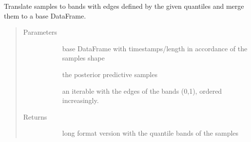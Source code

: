 \documentclass[letterpaper,10pt,english]{sphinxmanual}
\begin{document}
\begin{fulllineitems}
\label{\detokenize{autoapi/src/model/format/index:src.model.format.make_quantile_bands}}
Translate samples to bands with edges defined by the given quantiles and merge them to a base DataFrame.
\begin{quote}\begin{description}
\item[{Parameters}] \leavevmode\begin{description}
\item[{}] \leavevmode{[}\sphinxcode{\sphinxupquote{pd.DataFrame}}{]}
base DataFrame with timestamps/length in accordance of the samples shape

\item[{}] \leavevmode{[}\sphinxcode{\sphinxupquote{np.array}}{]}
the posterior predictive samples

\item[{}] \leavevmode
an iterable with the edges of the bands (0,1), ordered increasingly.

\end{description}

\item[{Returns}] \leavevmode\begin{description}
\item[{}] \leavevmode
long format version with the quantile bands of the samples

\end{description}

\end{description}\end{quote}

\end{fulllineitems}

\end{document}
